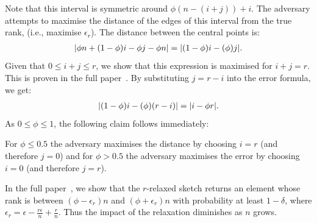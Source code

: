 Note that this interval is symmetric around $\phi(n-(i+j)) + i$.
The adversary attempts to maximise the distance of the edges of this interval from the true rank,
(i.e., maximise $\epsilon_r$). The distance between the central points is:
\begin{align*}
    \lvert\phi n + (1-\phi)i - \phi j - \phi n\rvert=\lvert(1-\phi)i - (\phi)j\rvert.
\end{align*}
Given that $0\leq i+j\leq r$, we show that this expression is maximised
for $i+j=r$.
This is proven in the full paper~\cite{rinberg2019fast}.
By substituting $j=r-i$ into the error formula, we get:
\begin{align*}
    \lvert(1-\phi)i - (\phi)(r-i)\rvert=\lvert i - \phi r\rvert.
\end{align*}
As $0\leq \phi \leq 1$, the following claim follows immediately:
\begin{claim}
    For $\phi \leq 0.5$ the adversary maximises the distance by choosing $i=r$ (and therefore $j=0$)
    and for $\phi > 0.5$ the adversary maximises the error by choosing $i=0$ (and therefore $j=r$).
    \label{clm:quantiles-relaxation-choice}
\end{claim}

\fi
In the full paper~\cite{rinberg2019fast}, we
show that the $r$-relaxed sketch returns an element whose rank is
between $(\phi-\epsilon_r)n$ and $(\phi+\epsilon_r)n$ with probability at
least $1-\delta$, where $\epsilon_r=\epsilon - \frac{r \epsilon}{n} + \frac{r}{n}$. Thus
the impact of the relaxation diminishes as $n$ grows.
